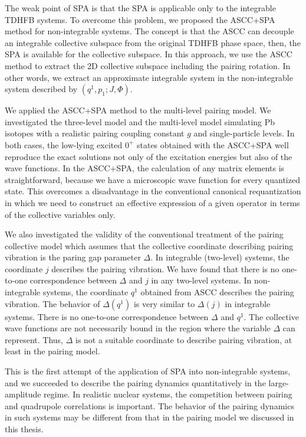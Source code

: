 \documentclass[11pt]{book} %
\begin{document}
The weak point of SPA is that the SPA is applicable only to the
integrable TDHFB systems. To overcome this problem, we proposed the ASCC+SPA method for non-integrable systems. The concept is that the ASCC can decouple an integrable collective subspace from the original TDHFB phase space, then, the SPA is available for the collective subspace.
In this approach, we use the ASCC method to extract the 2D
collective subspace including the pairing rotation.
In other words, we extract an approximate integrable system 
in the non-integrable system described by $(q^1,p_1;J,\Phi)$.

We applied the ASCC+SPA method to the multi-level pairing model.
We investigated the three-level model and 
the multi-level model simulating Pb isotopes
with a realistic pairing coupling constant $g$ and single-particle levels.
In both cases, the low-lying excited $0^+$ states obtained with
the ASCC+SPA well reproduce the exact solutions
not only of the excitation energies but also of the wave functions.
In the ASCC+SPA, the calculation of any matrix elements is straightforward,
because we have a microscopic wave function for every quantized state.
This overcomes a disadvantage in the conventional canonical requantization
in which we need to construct an effective expression of a given operator
in terms of the collective variables only.

We also investigated the validity of the conventional treatment of the pairing
collective model which assumes that the collective coordinate
describing pairing vibration is the paring gap parameter $\Delta$.
In integrable (two-level) systems, the coordinate $j$ describes the pairing vibration.
We have found that there is no
one-to-one correspondence between $\Delta$ and $j$ in any two-level systems.
In non-integrable systems, the coordinate $q^1$ obtained from ASCC describes the pairing vibration. The behavior of $\Delta(q^1)$ is very similar to $\Delta(j)$ in integrable systems. There is no
one-to-one correspondence between $\Delta$ and $q^1$.
The collective
wave functions are not necessarily bound in the region where
the variable $\Delta$ can represent.
Thus, $\Delta$ is not a suitable coordinate to describe pairing vibration, at least in the pairing model.

This is the first attempt of the application of SPA into non-integrable systems, and we succeeded to describe the pairing dynamics quantitatively in the large-amplitude regime. 
In realistic nuclear systems, the competition between pairing and quadrupole correlations is important. The behavior of the pairing dynamics in such systems may be different from that in the pairing model we discussed in this thesis.
\end{document}

